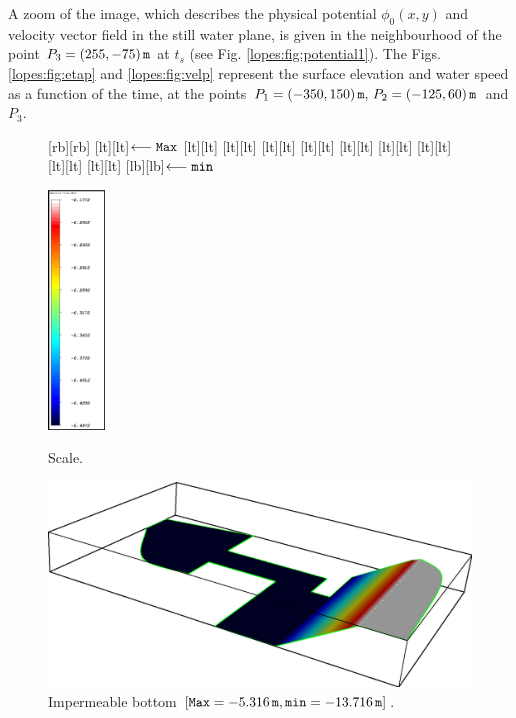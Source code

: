  A zoom of the image, which  describes
the physical potential \(\phi_0(x,y)\) and velocity vector field in the still
water plane, is given in  the neighbourhood of  the
point \(P_3=(255,-75)\,{\tt m}\) at \(t_s\) (see
Fig. \ref{lopes:fig:potential1}).
The Figs. \ref{lopes:fig:etap} and \ref{lopes:fig:velp} represent  
 the surface elevation and water speed as a function of the
 time, at the 
points \(P_1=(-350, 150)\,{\tt m},\, P_2=(-125,60)\,{\tt
m}\) and \(P_3\). 
\begin{figure}[!htb]
\begin{minipage}[t]{0.3\linewidth}
[rb][rb]{}
[lt][lt]{\(\longleftarrow\tt Max\)}
[lt][lt]{}
[lt][lt]{}
[lt][lt]{}
[lt][lt]{}
[lt][lt]{}
[lt][lt]{}
[lt][lt]{}
[lt][lt]{}
[lt][lt]{}
[lb][lb]{\(\longleftarrow\tt min\)}
{\centering
\includegraphics[width=1.5cm]{chapters/lopes/eps/table.eps}
\caption{Scale.}\label{lopes:fig:scale}\par}
\end{minipage}\hfill
\begin{minipage}[t]{0.7\linewidth}
{\centering     
\includegraphics[width=\largewidth]{chapters/lopes/eps/depth.eps}
\caption{Impermeable bottom \newline \([{\tt Max}=-5.316\,{\tt m},{\tt min}=-13.716\,{\tt m}]\).}
\label{lopes:fig:harbour_depth}\par}
\end{minipage}
\end{figure}
